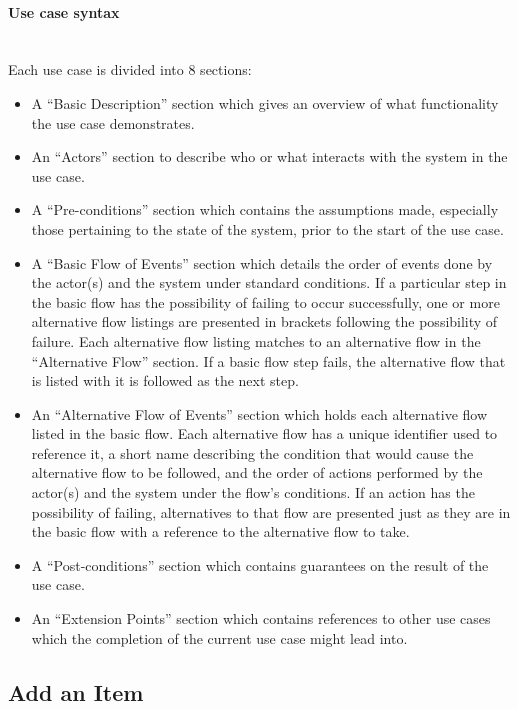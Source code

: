\documentclass{article}
\begin{document}
\paragraph{Use case syntax}
~\\
Each use case is divided into 8 sections:
\begin{itemize}
\item A ``Basic Description'' section which gives an overview of what functionality the use case demonstrates.
\item An ``Actors'' section to describe who or what interacts with the system in the use case.
\item A ``Pre-conditions'' section which contains the assumptions made, especially those pertaining to the state of the system, prior to the start of the use case.\label{pre_cond}
\item A ``Basic Flow of Events'' section which details the order of events done by the actor(s) and the system under standard conditions. If a particular step in the basic flow has the possibility of failing to occur successfully, one or more alternative flow listings are presented in brackets following the possibility of failure. Each alternative flow listing matches to an alternative flow in the ``Alternative Flow'' section. If a basic flow step fails, the alternative flow that is listed with it is followed as the next step.
\item An ``Alternative Flow of Events'' section which holds each alternative flow listed in the basic flow. Each alternative flow has a unique identifier used to reference it, a short name describing the condition that would cause the alternative flow to be followed, and the order of actions performed by the actor(s) and the system under the flow's conditions. If an action has the possibility of failing, alternatives to that flow are presented just as they are in the basic flow with a reference to the alternative flow to take.
\item A ``Post-conditions'' section which contains guarantees on the result of the use case.\label{post_cond}
\item An ``Extension Points'' section which contains references to other use cases which the completion of the current use case might lead into.
\end{itemize}

\subsection{Add an Item}
\end{document}

